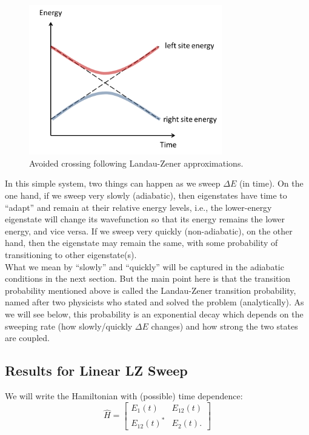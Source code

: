 \documentclass{book}
\theoremstyle{definition}
\begin{document}
\begin{figure}[!htb]
	\centering
	\includegraphics[width=0.75\textwidth]{images/avoided-crossing.png}
	\caption{Avoided crossing following Landau-Zener approximations.}
	\label{fig:LZ}
\end{figure}

In this simple system, two things can happen as we sweep $\Delta E$ (in time).  On the one hand, if we sweep very slowly (adiabatic), then eigenstates have time to ``adapt'' and remain at their relative energy levels, i.e., the lower-energy eigenstate will change its wavefunction so that its energy remains the lower energy, and vice versa. If we sweep very quickly (non-adiabatic), on the other hand, then the eigenstate may remain the same, with some probability of transitioning to other eigenstate(s). \\


What we mean by ``slowly'' and ``quickly'' will be captured in the adiabatic conditions in the next section. But the main point here is that the transition probability mentioned above is called the Landau-Zener transition probability, named after two physicists who stated and solved the problem (analytically). As we will see below, this probability is an exponential decay which depends on the sweeping rate (how slowly/quickly $\Delta E$ changes) and how strong the two states are coupled. 


\subsection*{Results for Linear LZ Sweep}

We will write the Hamiltonian with (possible) time dependence:
\begin{equation*}
\widehat{H} = \begin{bmatrix}
E_1(t) & E_{12}(t) \\ E_{12}(t)^* & E_{2}(t).
\end{bmatrix}
\end{equation*}
\end{document}
